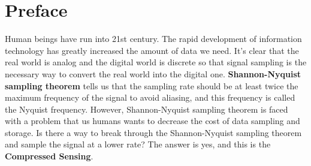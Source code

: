 \documentclass[12pt]{ctexart}
\begin{document}
\begin{titlepage}
    \centering
    \vspace*{96pt}
    \fontsize{26}{31.2}\selectfont{Introdution to Compressed Sensing}\par %
    \vspace{39pt}
    \fontsize{22}{26.4}\selectfont{\haettenfont v1 .1\normalfont}\par %
    \vspace{52.8pt}
    \fontsize{18}{21.6}\par %
    \fontsize{18}{21.6}\selectfont{Last Edited on: Sept 8th, 2025}\par %
    \vfill
\end{titlepage}

\newpage
\thispagestyle{empty}
\small
\tableofcontents
\newpage
\setcounter{page}{1}

\fancyhf{}
\fancyhead[C]{ }
\fancyfoot[C]{\bfseries\thepage}

\newpage
\titleformat{\section}[block]{\normalfont\Large\bfseries\centering}{}{0pt}{}
\section*{\textbf{Preface}}

Human beings have run into 21st century. The rapid development of information technology
has greatly increased the amount of data we need. It's clear that the real world is analog
and the digital world is discrete so that signal sampling is the necessary way to convert
the real world into the digital one. \textbf{Shannon-Nyquist sampling theorem} tells us
that the sampling rate should be at least twice the maximum frequency of the signal to
avoid aliasing, and this frequency is called the Nyquist frequency. However,
Shannon-Nyquist sampling theorem is faced with a problem that us humans wants to decrease
the cost of data sampling and storage. Is there a way to break through the
Shannon-Nyquist sampling theorem and sample the signal at a lower rate? The answer is yes,
and this is the \textbf{Compressed Sensing}.
\end{document}
